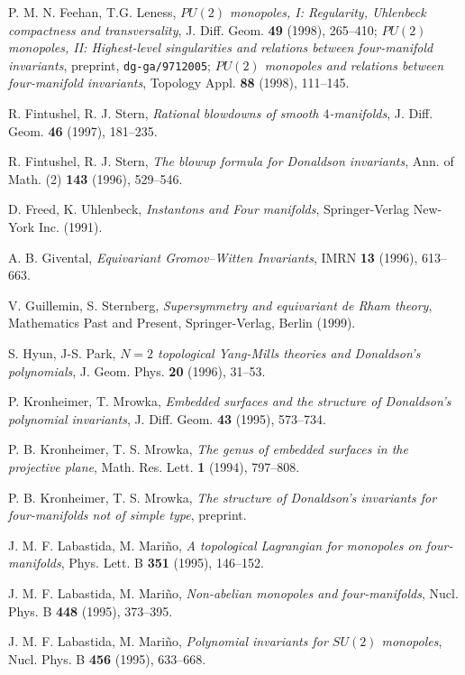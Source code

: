 \documentclass[a4paper,12pt,reqno,sumlimits]{amsart}
\theoremstyle{plain}
\theoremstyle{definition}
\newcommand{\1}{{\bf 1}}
\numberwithin{equation}{section}
\begin{document}
\begin{thebibliography}{999}
 P. M. N. Feehan, T.G. Leness, {\em $PU(2)$ monopoles, I:
    Regularity, Uhlenbeck compactness and transversality}, J. Diff. Geom.
  {\bf 49} (1998), 265--410; {\em $PU(2)$ monopoles, II: Highest-level
    singularities and relations between four-manifold invariants}, preprint,
  \texttt{dg-ga/9712005}; {\em $PU(2)$ monopoles and relations between
    four-manifold invariants}, Topology Appl. {\bf 88} (1998), 111--145.
  
 R. Fintushel, R. J. Stern, {\em Rational blowdowns of smooth $4$-manifolds},
  J. Diff. Geom. {\bf 46} (1997), 181--235. 

 R. Fintushel, R. J. Stern, {\em The blowup formula for Donaldson invariants},
  Ann. of Math. (2) {\bf 143} (1996), 529--546.

 D. Freed, K. Uhlenbeck, {\em Instantons and Four manifolds},
  Springer-Verlag New-York Inc. (1991).
  
 A. B. Givental, {\em Equivariant Gromov--Witten
    Invariants}, IMRN {\bf 13} (1996), 613--663.
  
 V. Guillemin, S. Sternberg, {\em Supersymmetry and
    equivariant de Rham theory}, Mathematics Past and Present,
  Springer-Verlag, Berlin (1999).
  
 S. Hyun, J-S. Park, {\em $N=2$ topological Yang-Mills theories
    and Donaldson's polynomials}, J. Geom. Phys. {\bf 20} (1996), 31--53.
  
 P. Kronheimer, T. Mrowka, {\em Embedded surfaces and the
    structure of Donaldson's polynomial invariants}, J. Diff. Geom. {\bf 43}
  (1995), 573--734.
  
 P. B. Kronheimer, T. S. Mrowka, {\em The genus of embedded
    surfaces in the projective plane}, Math. Res. Lett. {\bf 1} (1994),
  797--808.
  
 P. B. Kronheimer, T. S. Mrowka, {\em The structure of
    Donaldson's invariants for four-manifolds not of simple type}, preprint.
  
 J. M. F. Labastida, M. Mari\~no, {\em A topological
    Lagrangian for monopoles on four-manifolds}, Phys. Lett. B {\bf 351}
  (1995), 146--152.
  
 J. M. F. Labastida, M. Mari\~no, {\em Non-abelian
    monopoles and four-manifolds}, Nucl. Phys. B {\bf 448} (1995),
  373--395.
  
 J. M. F. Labastida, M. Mari\~no, {\em Polynomial
    invariants for $SU(2)$ monopoles}, Nucl. Phys. B {\bf 456} (1995),
  633--668.
  

\end{thebibliography}
\end{document}
